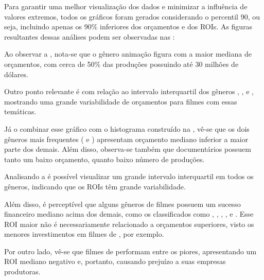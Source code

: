 Para garantir uma melhor visualização dos dados e minimizar a influência de valores extremos, todos os gráficos foram gerados considerando o percentil 90, ou seja, incluindo apenas os 90\% inferiores dos orçamentos e dos \acrshort{ROI}s. As figuras resultantes dessas análises podem ser observadas nas  :

%

Ao observar a , nota-se que o gênero animação figura com a maior mediana de orçamentos, com cerca de 50\% das produções possuindo até 30 milhões de dólares.

Outro ponto relevante é com relação ao intervalo interquartil dos gêneros , ,  e , mostrando uma grande variabilidade de orçamentos para filmes com essas temáticas.

Já o combinar esse gráfico com o histograma construído na , vê-se que os dois gêneros mais frequentes ( e ) apresentam orçamento mediano inferior a maior parte dos demais. Além disso, observa-se também que documentários possuem tanto um baixo orçamento, quanto baixo número de produções.


%

Analisando a  é possível visualizar um grande intervalo interquartil em todos os gêneros, indicando que os \acrshort{ROI}s têm grande variabilidade.

Além disso, é perceptível que alguns gêneros de filmes possuem um sucesso financeiro mediano acima dos demais, como os classificados como , , , ,  e . Esse \acrshort{ROI} maior não é necessariamente relacionado a orçamentos superiores, visto os menores investimentos em filmes de , por exemplo.

Por outro lado, vê-se que filmes de  performam entre os piores, apresentando um \acrshort{ROI} mediano negativo e, portanto, causando prejuízo a suas empresas produtoras.

%

